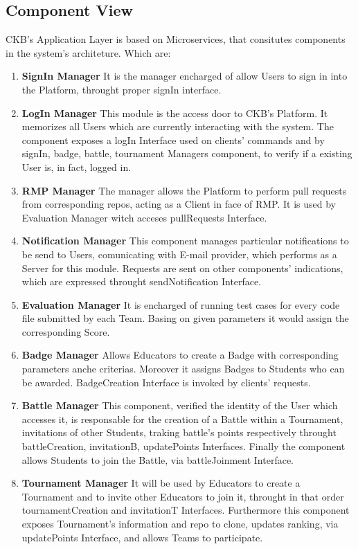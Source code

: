 \subsection{Component View}
CKB's Application Layer is based on Microservices, that consitutes components in the system's architeture.
Which are:
\begin{enumerate}
    \item \textbf{SignIn Manager} It is the manager encharged of allow Users to sign in into the Platform, throught proper signIn interface.
    \item \textbf{LogIn Manager} This module is the access door to CKB's Platform. It memorizes all Users which are currently interacting with the system. The component exposes a logIn Interface used on clients' commands and by signIn, badge, battle, tournament Managers component, to verify if a existing User is, in fact, logged in.
    \item \textbf{RMP Manager} The manager allows the Platform to perform pull requests from corresponding repos, acting as a Client in face of RMP. It is used by Evaluation Manager witch acceses pullRequests Interface.
    \item \textbf{Notification Manager} This component manages particular notifications to be send to Users, comunicating with E-mail provider, which performs as a Server for this module. Requests are sent on other components' indications, which are expressed throught sendNotification Interface.
    \item \textbf{Evaluation Manager} It is encharged of running test cases for every code file submitted by each Team. Basing on given parameters it would assign the corresponding Score.
    \item \textbf{Badge Manager} Allows Educators to create a Badge with corresponding parameters anche criterias. Moreover it assigns Badges to Students who can be awarded. BadgeCreation Interface is invoked by clients' requests.
    \item \textbf{Battle Manager} This component, verified the identity of the User which accesses it, is responsable for the creation of a Battle within a Tournament, invitations of other Students, traking battle's points respectively throught battleCreation, invitationB, updatePoints Interfaces. Finally the component allows Students to join the Battle, via battleJoinment Interface.
    \item \textbf{Tournament Manager} It will be used by Educators to create a Tournament and to invite other Educators to join it, throught in that order tournamentCreation and invitationT Interfaces. Furthermore this component exposes Tournament's information and repo to clone, updates ranking, via updatePoints Interface, and allows Teams to participate.

\end{enumerate}
